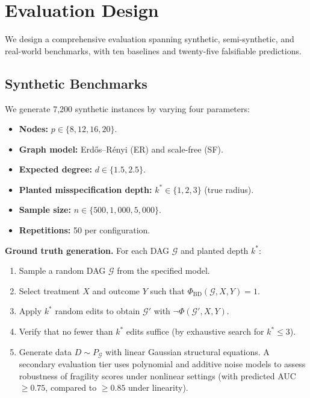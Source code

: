 \documentclass[11pt,a4paper]{article}
\theoremstyle{definition}
\theoremstyle{remark}
\newcommand{\DAG}{\mathcal{G}}
\newcommand{\Phi}{\varPhi}
\begin{document}
\section{Evaluation Design}\label{sec:eval}

We design a comprehensive evaluation spanning synthetic, semi-synthetic, and real-world
benchmarks, with ten baselines and twenty-five falsifiable predictions.

\subsection{Synthetic Benchmarks}

We generate 7{,}200 synthetic instances by varying four parameters:

\begin{itemize}
\item \textbf{Nodes:} $p \in \{8, 12, 16, 20\}$.
\item \textbf{Graph model:} Erd\H{o}s--R\'enyi (ER) and scale-free (SF).
\item \textbf{Expected degree:} $d \in \{1.5, 2.5\}$.
\item \textbf{Planted misspecification depth:} $k^* \in \{1, 2, 3\}$ (true radius).
\item \textbf{Sample size:} $n \in \{500, 1{,}000, 5{,}000\}$.
\item \textbf{Repetitions:} 50 per configuration.
\end{itemize}

\noindent\textbf{Ground truth generation.} For each DAG $\DAG$ and planted depth $k^*$:
\begin{enumerate}
  \item Sample a random DAG $\DAG$ from the specified model.
  \item Select treatment $X$ and outcome $Y$ such that $\Phi_{\mathrm{BD}}(\DAG, X, Y) = 1$.
  \item Apply $k^*$ random edits to obtain $\DAG'$ with $\neg\Phi(\DAG', X, Y)$.
  \item Verify that no fewer than $k^*$ edits suffice (by exhaustive search for
    $k^* \leq 3$).
  \item Generate data $D \sim P_\DAG$ with linear Gaussian structural equations.
    A secondary evaluation tier uses polynomial and additive noise models to assess
    robustness of fragility scores under nonlinear settings (with predicted AUC
    $\geq 0.75$, compared to $\geq 0.85$ under linearity).
\end{enumerate}
\end{document}
